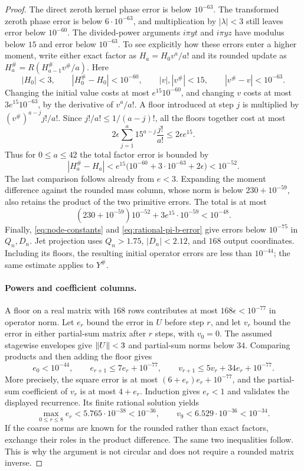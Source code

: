 \begin{proof}
The direct zeroth kernel phase error is below $10^{-63}$.  The transformed
zeroth phase error is below $6\cdot10^{-63}$, and multiplication by
$|\lambda|<3$ still leaves error below $10^{-60}$.  The divided-power
arguments $i\pi yt$ and $i\pi yz$ have modulus below $15$ and error below
$10^{-63}$.  To see explicitly how these errors enter a higher moment, write
either exact factor as $H_a=H_0v^a/a!$ and its rounded update as
$H_a^\#=R(H_{a-1}^\#v^\#/a)$.  Here
\[
 |H_0|<3,\qquad |H_0^\#-H_0|<10^{-60},\qquad
 |v|,|v^\#|<15,\qquad |v^\#-v|<10^{-63}.
\]
Changing the initial value costs at most $e^{15}10^{-60}$, and changing
$v$ costs at most $3e^{15}10^{-63}$, by the derivative of $v^a/a!$.
A floor introduced at step $j$ is multiplied by
$(v^\#)^{a-j}j!/a!$.  Since $j!/a!\le1/(a-j)!$, all the floors together
cost at most
\[
 2\epsilon\sum_{j=1}^a15^{a-j}\frac{j!}{a!}\le2\epsilon e^{15}.
\]
Thus for $0\le a\le42$ the total factor error is bounded by
\[
 |H_a^\#-H_a|
 <e^{15}\bigl(10^{-60}+3\cdot10^{-63}+2\epsilon\bigr)<10^{-52}.
\]
The last comparison follows already from $e<3$.
Expanding the moment difference against the rounded mass column, whose norm
is below $230+10^{-59}$,
also retains the product of the two primitive errors.  The total is at most
\[
 (230+10^{-59})10^{-52}+3e^{15}\cdot10^{-59}<10^{-48}.
\]
Finally, \eqref{eq:node-constants} and \eqref{eq:rational-pi-b-error}
give errors below $10^{-75}$ in $Q_n,D_n$.  Jet projection uses
$Q_n>1.75$, $|D_n|<2.12$, and $168$ output coordinates.  Including its
floors, the resulting initial operator errors are less than $10^{-44}$;
the same estimate applies to $Y^\#$.

\paragraph{Powers and coefficient columns.}
A floor on a real matrix with $168$ rows contributes at most
$168\epsilon<10^{-77}$ in operator norm.  Let $e_r$ bound the error in
$U$ before step $r$, and let $v_r$ bound the error in either partial-sum
matrix after $r$ steps, with $v_0=0$.  The assumed stagewise envelopes give
$\left\lVert U\right\rVert<3$ and partial-sum norms below $34$.  Comparing products and
then adding the floor gives
\begin{equation}\label{eq:matrix-roundoff-recurrence}
 e_0<10^{-44},\qquad
 e_{r+1}\le7e_r+10^{-77},\qquad
 v_{r+1}\le5v_r+34e_r+10^{-77}.
\end{equation}
More precisely, the square error is at most $(6+e_r)e_r+10^{-77}$,
and the partial-sum coefficient of $v_r$ is at most $4+e_r$.
Induction gives $e_r<1$ and validates the displayed recurrence.  Its
finite rational solution yields
\[
 \max_{0\le r\le8}e_r<5.765\cdot10^{-38}<10^{-36},
 \qquad v_9<6.529\cdot10^{-36}<10^{-34}.
\]
If the coarse norms are known for the rounded rather than exact factors,
exchange their roles in the product difference.  The same two inequalities
follow.  This is why the argument is not circular and does not require a
rounded matrix inverse.


\end{proof}
